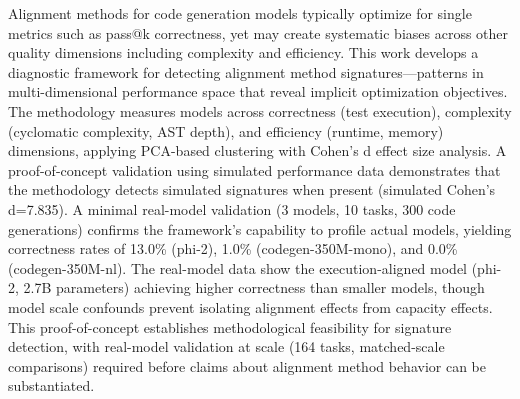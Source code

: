 
Alignment methods for code generation models typically optimize for single metrics such as pass@k correctness, yet may create systematic biases across other quality dimensions including complexity and efficiency. This work develops a diagnostic framework for detecting alignment method signatures---patterns in multi-dimensional performance space that reveal implicit optimization objectives. The methodology measures models across correctness (test execution), complexity (cyclomatic complexity, AST depth), and efficiency (runtime, memory) dimensions, applying PCA-based clustering with Cohen's d effect size analysis. A proof-of-concept validation using simulated performance data demonstrates that the methodology detects simulated signatures when present (simulated Cohen's d=7.835). A minimal real-model validation (3 models, 10 tasks, 300 code generations) confirms the framework's capability to profile actual models, yielding correctness rates of 13.0\% (phi-2), 1.0\% (codegen-350M-mono), and 0.0\% (codegen-350M-nl). The real-model data show the execution-aligned model (phi-2, 2.7B parameters) achieving higher correctness than smaller models, though model scale confounds prevent isolating alignment effects from capacity effects. This proof-of-concept establishes methodological feasibility for signature detection, with real-model validation at scale (164 tasks, matched-scale comparisons) required before claims about alignment method behavior can be substantiated.
